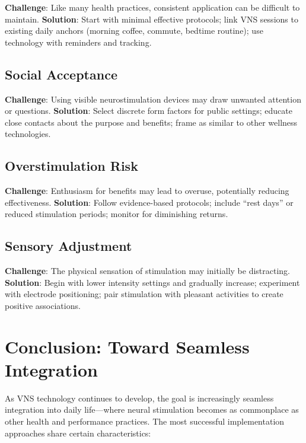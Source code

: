 \documentclass[
  Letterpaper,
]{scrbook}
\begin{document}
\textbf{Challenge}: Like many health practices, consistent application
can be difficult to maintain. \textbf{Solution}: Start with minimal
effective protocols; link VNS sessions to existing daily anchors
(morning coffee, commute, bedtime routine); use technology with
reminders and tracking.

\subsection{Social Acceptance}\label{social-acceptance}

\textbf{Challenge}: Using visible neurostimulation devices may draw
unwanted attention or questions. \textbf{Solution}: Select discrete form
factors for public settings; educate close contacts about the purpose
and benefits; frame as similar to other wellness technologies.

\subsection{Overstimulation Risk}\label{overstimulation-risk}

\textbf{Challenge}: Enthusiasm for benefits may lead to overuse,
potentially reducing effectiveness. \textbf{Solution}: Follow
evidence-based protocols; include ``rest days'' or reduced stimulation
periods; monitor for diminishing returns.

\subsection{Sensory Adjustment}\label{sensory-adjustment}

\textbf{Challenge}: The physical sensation of stimulation may initially
be distracting. \textbf{Solution}: Begin with lower intensity settings
and gradually increase; experiment with electrode positioning; pair
stimulation with pleasant activities to create positive associations.

\section{Conclusion: Toward Seamless
Integration}\label{conclusion-toward-seamless-integration}

As VNS technology continues to develop, the goal is increasingly
seamless integration into daily life---where neural stimulation becomes
as commonplace as other health and performance practices. The most
successful implementation approaches share certain characteristics:
\end{document}
